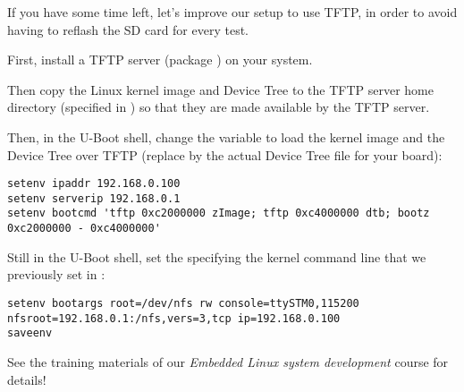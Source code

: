 If you have some time left, let's improve our setup to use TFTP, in
order to avoid having to reflash the SD card for every test.

First, install a TFTP server (package ) on your system.

Then copy the Linux kernel image and Device Tree to the TFTP server home
directory (specified in ) so that they are
made available by the TFTP server.

Then, in the U-Boot shell, change the  variable to load the
kernel image and the Device Tree over TFTP (replace  by
the actual Device Tree file for your board):

\begin{verbatim}
setenv ipaddr 192.168.0.100
setenv serverip 192.168.0.1
setenv bootcmd 'tftp 0xc2000000 zImage; tftp 0xc4000000 dtb; bootz 0xc2000000 - 0xc4000000'
\end{verbatim}

Still in the U-Boot shell, set the  specifying the kernel command line that
we previously set in :

{\small
\begin{verbatim}
setenv bootargs root=/dev/nfs rw console=ttySTM0,115200 nfsroot=192.168.0.1:/nfs,vers=3,tcp ip=192.168.0.100
saveenv
\end{verbatim}
}

See the training materials of our {\em Embedded Linux system development}
course for details!
